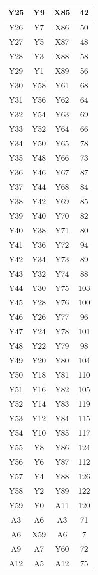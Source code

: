 \begin{longtable}{|c|c|c|c|}
  Y25   & Y9     & X85   & 42     \\ \hline
  Y26   & Y7     & X86   & 50     \\ \hline
  Y27   & Y5     & X87   & 48     \\ \hline
  Y28   & Y3     & X88   & 58     \\ \hline
  Y29   & Y1     & X89   & 56     \\ \hline
  Y30   & Y58    & Y61   & 68     \\ \hline
  Y31   & Y56    & Y62   & 64     \\ \hline
  Y32   & Y54    & Y63   & 69     \\ \hline
  Y33   & Y52    & Y64   & 66     \\ \hline
  Y34   & Y50    & Y65   & 78     \\ \hline
  Y35   & Y48    & Y66   & 73     \\ \hline
  Y36   & Y46    & Y67   & 87     \\ \hline
  Y37   & Y44    & Y68   & 84     \\ \hline
  Y38   & Y42    & Y69   & 85     \\ \hline
  Y39   & Y40    & Y70   & 82     \\ \hline
  Y40   & Y38    & Y71   & 80     \\ \hline
  Y41   & Y36    & Y72   & 94     \\ \hline
  Y42   & Y34    & Y73   & 89     \\ \hline
  Y43   & Y32    & Y74   & 88     \\ \hline
  Y44   & Y30    & Y75   & 103    \\ \hline
  Y45   & Y28    & Y76   & 100    \\ \hline
  Y46   & Y26    & Y77   & 96     \\ \hline
  Y47   & Y24    & Y78   & 101    \\ \hline
  Y48   & Y22    & Y79   & 98     \\ \hline
  Y49   & Y20    & Y80   & 104    \\ \hline
  Y50   & Y18    & Y81   & 110    \\ \hline
  Y51   & Y16    & Y82   & 105    \\ \hline
  Y52   & Y14    & Y83   & 119    \\ \hline
  Y53   & Y12    & Y84   & 115    \\ \hline
  Y54   & Y10    & Y85   & 117    \\ \hline
  Y55   & Y8     & Y86   & 124    \\ \hline
  Y56   & Y6     & Y87   & 112    \\ \hline
  Y57   & Y4     & Y88   & 126    \\ \hline
  Y58   & Y2     & Y89   & 122    \\ \hline
  Y59   & Y0     & A11   & 120    \\ \hline
  A3    & A6     & A3    & 71     \\ \hline
  A6    & X59    & A6    & 7      \\ \hline
  A9    & A7     & Y60   & 72     \\ \hline
  A12   & A5     & A12   & 75     \\ \hline
  

\end{longtable}
